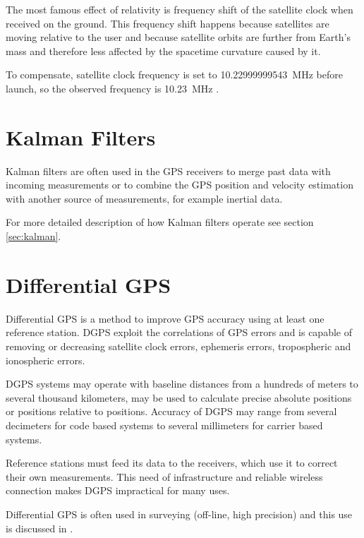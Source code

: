 The most famous effect of relativity is frequency shift of the satellite clock
when received on the ground.
This frequency shift happens because satellites are moving relative to the user
and because satellite orbits are further from Earth's mass and therefore less
affected by the spacetime curvature caused by it.

To compensate, satellite clock frequency is set to
\SI{10.22999999543}{\mega\hertz} before launch, so the observed frequency
is \SI{10.23}{\mega\hertz} \cite{fyfe92}.

\section{Kalman Filters}
Kalman filters are often used in the GPS receivers to merge past
data with incoming measurements or to combine the GPS position and velocity
estimation with another source of measurements, for example inertial data.

For more detailed description of how Kalman filters operate see section
\ref{sec:kalman}.

\section{Differential GPS}
\label{sec:dgps}

Differential GPS is a method to improve GPS accuracy using at least one reference station.
DGPS exploit the correlations of GPS errors and is capable of removing or decreasing satellite clock errors,
ephemeris errors, tropospheric and ionospheric errors.

DGPS systems may operate with baseline distances from a hundreds of meters to several thousand kilometers,
may be used to calculate precise absolute positions or positions relative to positions.
Accuracy of DGPS may range from several decimeters for code based systems to several
millimeters for carrier based systems.

Reference stations must feed its data to the receivers, which use it to correct their own measurements.
This need of infrastructure and reliable wireless connection makes DGPS impractical for many uses.


Differential GPS is often used in surveying (off-line, high precision) and this
use is discussed in \cite{rizos99}.

